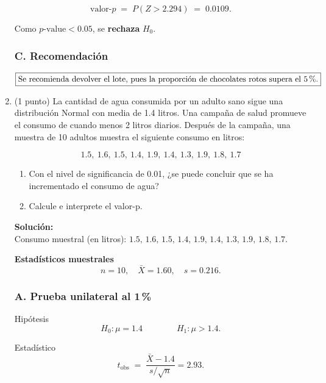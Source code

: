 \documentclass[12pt]{article}
\begin{document}
\begin{enumerate}
	      \[
		      \text{valor-}p \;=\; P(Z>2.294)\;=\;0.0109.
	      \]

	      Como \(p\text{-value} < 0.05\), se \textbf{rechaza} \(H_0\).

	      \subsubsection*{C. Recomendación}

	      \[
		      \boxed{\text{Se recomienda devolver el lote, pues la proporción
				      de chocolates rotos supera el 5\,\%.}}
	      \]

	      \endgroup

	\item (1 punto) La cantidad de agua consumida por un adulto sano sigue una distribución Normal con media de 1.4 litros. Una campaña de salud promueve el consumo de cuando menos 2 litros diarios. Después de la campaña, una muestra de 10 adultos muestra el siguiente consumo en litros:

	      \[
		      1.5,\ 1.6,\ 1.5,\ 1.4,\ 1.9,\ 1.4,\ 1.3,\ 1.9,\ 1.8,\ 1.7
	      \]

	      \begin{enumerate}
		      \item Con el nivel de significancia de 0.01, ¿se puede concluir que se ha
		            incrementado el consumo de agua?
		      \item Calcule e interprete el valor-p.
	      \end{enumerate}

	      \begingroup\color{blue}
	      \textbf{Solución:}\\
	      Consumo muestral (en litros): $1.5,\,1.6,\,1.5,\,1.4,\,1.9,\,1.4,\,1.3,\,1.9,\,1.8,\,1.7$.

	      \vspace{0.5em}
	      \textbf{Estadísticos muestrales}
	      \[
		      n = 10, \quad \bar X = 1.60, \quad s = 0.216.
	      \]

	      \subsubsection*{A. Prueba unilateral al 1\,\%}

	      Hipótesis
	      \[
		      H_0 : \mu = 1.4 \qquad\qquad
		      H_1 : \mu > 1.4.
	      \]

	      Estadístico
	      \[
		      t_{\text{obs}} \;=\;
		      \frac{\bar X - 1.4}{s/\sqrt{n}}
		      = 2.93.
	      \]


\end{enumerate}
\end{document}
